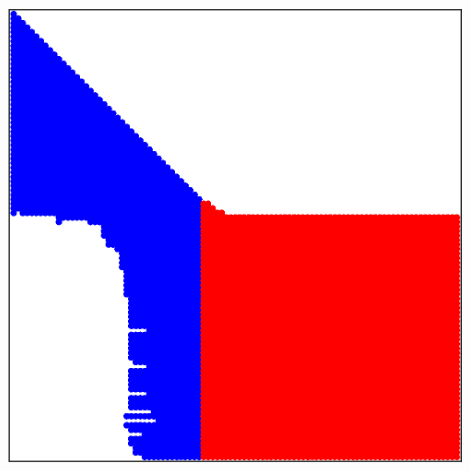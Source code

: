 \documentclass[compress,10pt]{beamer}
\begin{document}
\begin{frame}[t]
\begin{columns}
\includegraphics[width=0.9\textwidth]{images/Sparsity_HDPE.eps}
\end{columns}
\end{frame}
\end{document}
